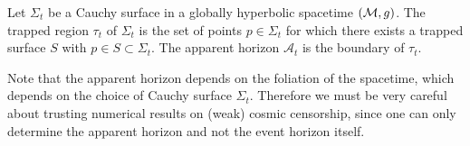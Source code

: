 \begin{defn}
    Let $\Sigma_t$ be a Cauchy surface in a globally hyperbolic spacetime $(\mathcal{M},g)$. The trapped region $\tau_t$ of $\Sigma_t$ is the set of points $p\in \Sigma_t$ for which there exists a trapped surface $S$ with $p\in S \subset \Sigma_t$. The apparent horizon $\mathcal{A}_t$ is the boundary of $\tau_t$.
\end{defn}
Note that the apparent horizon depends on the foliation of the spacetime, which depends on the choice of Cauchy surface $\Sigma_t$. Therefore we must be very careful about trusting numerical results on (weak) cosmic censorship, since one can only determine the apparent horizon and not the event horizon itself.